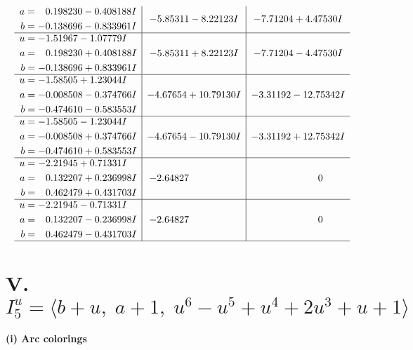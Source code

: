 \documentclass[1p]{elsarticle_modified}
\theoremstyle{definition}
\begin{document}
$$\begin{array}{c|c|c}
\begin{aligned}
a &= \phantom{-}0.198230 - 0.408188 I \\
b &= -0.138696 - 0.833961 I\end{aligned}
 & -5.85311 - 8.22123 I & -7.71204 + 4.47530 I \\ \hline\begin{aligned}
u &= -1.51967 - 1.07779 I \\
a &= \phantom{-}0.198230 + 0.408188 I \\
b &= -0.138696 + 0.833961 I\end{aligned}
 & -5.85311 + 8.22123 I & -7.71204 - 4.47530 I \\ \hline\begin{aligned}
u &= -1.58505 + 1.23044 I \\
a &= -0.008508 - 0.374766 I \\
b &= -0.474610 - 0.583553 I\end{aligned}
 & -4.67654 + 10.79130 I & -3.31192 - 12.75342 I \\ \hline\begin{aligned}
u &= -1.58505 - 1.23044 I \\
a &= -0.008508 + 0.374766 I \\
b &= -0.474610 + 0.583553 I\end{aligned}
 & -4.67654 - 10.79130 I & -3.31192 + 12.75342 I \\ \hline\begin{aligned}
u &= -2.21945 + 0.71331 I \\
a &= \phantom{-}0.132207 + 0.236998 I \\
b &= \phantom{-}0.462479 + 0.431703 I\end{aligned}
 & -2.64827\phantom{ +0.000000I} & \phantom{-0.000000 } 0 \\ \hline\begin{aligned}
u &= -2.21945 - 0.71331 I \\
a &= \phantom{-}0.132207 - 0.236998 I \\
b &= \phantom{-}0.462479 - 0.431703 I\end{aligned}
 & -2.64827\phantom{ +0.000000I} & \phantom{-0.000000 } 0\\
 \hline 
 \end{array}$$\newpage\newpage\renewcommand{\arraystretch}{1}
\centering \section*{V. $I^u_{5}= \langle b+u,\;a+1,\;u^6- u^5+u^4+2 u^3+u+1 \rangle$}
\flushleft \textbf{(i) Arc colorings}\\
\end{document}
